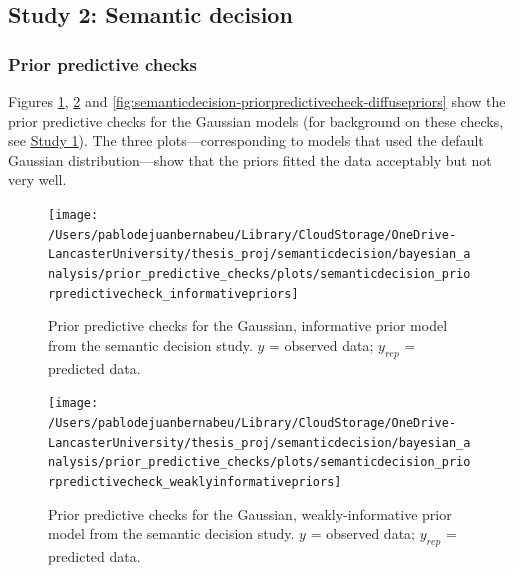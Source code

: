 \documentclass[
  12pt,
  man,floatsintext]{apa7}
\begin{document}
\hypertarget{study-2-semantic-decision-2}{%
\subsection{Study 2: Semantic decision}\label{study-2-semantic-decision-2}}

\hypertarget{prior-predictive-checks-1}{%
\subsubsection{Prior predictive checks}\label{prior-predictive-checks-1}}

Figures \ref{fig:semanticdecision-priorpredictivecheck-informativepriors}, \ref{fig:semanticdecision-priorpredictivecheck-weaklyinformativepriors} and \ref{fig:semanticdecision-priorpredictivecheck-diffusepriors} show the prior predictive checks for the Gaussian models (for background on these checks, see \protect\hyperlink{study1-bayesian-diagnostics}{\underline{Study 1}}). The three plots---corresponding to models that used the default Gaussian distribution---show that the priors fitted the data acceptably but not very well.



\begin{figure}

{\centering \texttt{[image: /Users/pablodejuanbernabeu/Library/CloudStorage/OneDrive-LancasterUniversity/thesis\_proj/semanticdecision/bayesian\_analysis/prior\_predictive\_checks/plots/semanticdecision\_priorpredictivecheck\_informativepriors]} 

}

\caption{Prior predictive checks for the Gaussian, informative prior model from the semantic decision study. \(y\) = observed data; \(y_{rep}\) = predicted data.}\label{fig:semanticdecision-priorpredictivecheck-informativepriors}
\end{figure}



\begin{figure}

{\centering \texttt{[image: /Users/pablodejuanbernabeu/Library/CloudStorage/OneDrive-LancasterUniversity/thesis\_proj/semanticdecision/bayesian\_analysis/prior\_predictive\_checks/plots/semanticdecision\_priorpredictivecheck\_weaklyinformativepriors]} 

}

\caption{Prior predictive checks for the Gaussian, weakly-informative prior model from the semantic decision study. \(y\) = observed data; \(y_{rep}\) = predicted data.}\label{fig:semanticdecision-priorpredictivecheck-weaklyinformativepriors}
\end{figure}
\end{document}
